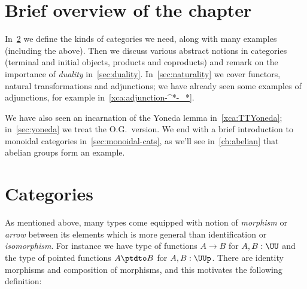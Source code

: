 \section{Brief overview of the chapter}

In~\cref{sec:categories} we define the kinds of categories we need, along with many examples (including the above).
Then we discuss various abstract notions in categories (terminal and initial objects, products and coproducts)
and remark on the importance of \emph{duality} in~\cref{sec:duality}.
In~\cref{sec:naturality} we cover functors, natural transformations and adjunctions; we have already seen some examples of adjunctions, for example in~\cref{xca:adjunction-^*-_*}.

We have also seen an incarnation of the Yoneda lemma in~\cref{xca:TTYoneda};
in~\cref{sec:yoneda} we treat the O.G.\ version. We end with a brief introduction to monoidal categories in~\cref{sec:monoidal-cats}, as we'll see in~\cref{ch:abelian} that abelian groups form an example.

\section{Categories}
\label{sec:categories}

As mentioned above, many types come equipped with notion
of \emph{morphism} or \emph{arrow} between its elements
which is more general than identification or \emph{isomorphism}.
For instance
we have type of functions $A \to B$ for $A,B:\UU$
and the type of pointed functions $A \ptdto B$ for $A,B:\UUp$.
There are identity morphisms and composition of morphisms,
and this motivates the following definition:

